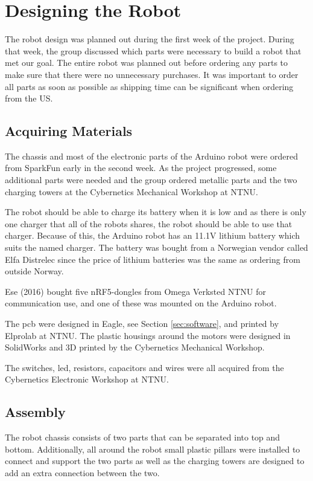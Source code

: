 \section{Designing the Robot}
\label{sec:robotdesign}
The robot design was planned out during the first week of the project. During that week, the group discussed which parts were necessary to build a robot that met our goal. The entire robot was planned out before ordering any parts to make sure that there were no unnecessary purchases. It was important to order all parts as soon as possible as shipping time can be significant when ordering from the US.

\subsection{Acquiring Materials}
The chassis and most of the electronic parts of the Arduino robot were ordered from SparkFun \cite{sparkfun} early in the second week. As the project progressed, some additional parts were needed and the group ordered metallic parts and the two charging towers at the Cybernetics Mechanical Workshop at NTNU.

The robot should be able to charge its battery when it is low and as there is only one charger that all of the robots shares, the robot should be able to use that charger. Because of this, the Arduino robot has an 11.1V lithium battery which suits the named charger. The battery was bought from a Norwegian vendor called Elfa Distrelec\cite{elfa} since the price of lithium batteries was the same as ordering from outside Norway.

Ese (2016) bought five nRF5-dongles from Omega Verksted NTNU  for communication use, and one of these was mounted on the Arduino robot.

The \acrshort{pcb} were designed in Eagle, see Section \ref{sec:software}, and printed by Elprolab\cite{elprolab} at NTNU. The plastic housings around the motors were designed in SolidWorks and 3D printed by the Cybernetics Mechanical Workshop.

The switches, \acrfull{led}, resistors, capacitors and wires were all acquired from the Cybernetics Electronic Workshop at NTNU.


\subsection{Assembly}
The robot chassis consists of two parts that can be separated into top and bottom. Additionally, all around the robot small plastic pillars were installed to connect and support the two parts as well as the charging towers are designed to add an extra connection between the two.

